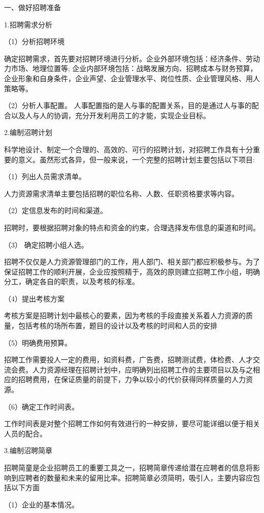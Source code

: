 一、做好招聘准备

    1.招聘需求分析

    （1）分析招聘环境

    确定招聘需求，首先要对招聘环境进行分析。企业外部环境包括：经济条件、劳动力市场、地理位置等; 企业内部环境包括：战略发展方向、招聘成本与财务预算，企业形象和自身条件，企业声望、企业管理水平、岗位性质、企业管理风格、用人策略等。

    （2）分析人事配置。
    人事配置指的是人与事的配置关系，目的是通过人与事的配合以及人与人的协调，充分开发利用员工的才能，实现企业目标。

    2.编制沼聘计划

    科学地设计、制定一个合理的、高效的、可行的招聘计划，对招聘工作具有十分重要的意义。虽然形式各异，但一般来说，一个完整的招聘计划主要包括以下项目:

    （1）列出人员需求清单。

    人力资源需求清单主要包括招聘的职位名称、人数、任职资格要求等内容。

    （2）定信息发布的时间和渠道。

    招聘时，要根据招聘对象的特点和资金的约束，合理选择发布信息的渠道和时间。

    （3） 确定招聘小组人选。

    招聘不仅仅是人力资源管理部门的工作，用人部门、相关部门都应积极参与。为了保证招聘工作的顺利开展，企业应按照精于，高效的原则建立招聘工作小组，明确分工，确定各自的职责，以及考核的标准。

    （4）提出考核方案

    考核方案是招聘计划中最核心的要素，因为考核的手段直接关系着人力资源的质量，包括考核的场所布置，题目的设计以及考核的时间和人员的安排

    （5）明确费用预算。

    招聘工作需要投人一定的费用，如资料费，广告费，招聘测试费，体检费、人才交流会费。人力资源经理在招聘计划中，应明确列出招聘工作的主要项目以及与之相应的招聘费用，在保证质量的前提下，力争以较小的代价获得同样质量的人力资源。

    （6）确定工作时间表。

    工作时间表是对整个招聘工作如何有效进行的一种安排，要尽可能详细以便于相关人员的配合。

    3.编制沼聘简章

    招聘简童是企业招聘员工的重要工具之一，招聘简章传递给潜在应聘者的信息将影响到应聘者的数量和未来的留用比率。招聘简章必须简明，吸引人，主要内容应包括以下方面

    （1）企业的基本情况。

